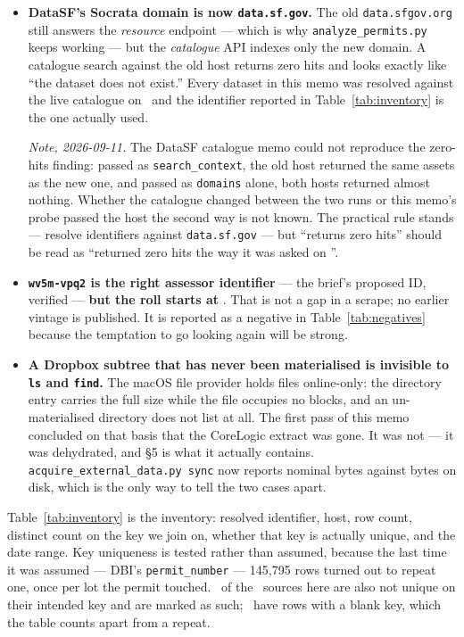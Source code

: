 \documentclass[11pt]{article}
\begin{document}
\begin{itemize}
\item \textbf{DataSF's Socrata domain is now \texttt{data.sf.gov}.} The old
\texttt{data.sfgov.org} still answers the \emph{resource} endpoint --- which is why
\texttt{analyze\_permits.py} keeps working --- but the \emph{catalogue} API indexes only the
new domain. A catalogue search against the old host returns zero hits and looks exactly like
``the dataset does not exist.'' Every dataset in this memo was resolved against the live
catalogue on \acqRetrieved\ and the identifier reported in Table~\ref{tab:inventory} is the
one actually used.

\emph{Note, 2026-09-11.} The DataSF catalogue memo could not reproduce the zero-hits finding:
passed as \texttt{search\_context}, the old host returned the same assets as the new one, and
passed as \texttt{domains} alone, both hosts returned almost nothing. Whether the catalogue
changed between the two runs or this memo's probe passed the host the second way is not known.
The practical rule stands --- resolve identifiers against \texttt{data.sf.gov} --- but ``returns
zero hits'' should be read as ``returned zero hits the way it was asked on \acqRetrieved''.
\item \textbf{\texttt{wv5m-vpq2} is the right assessor identifier} --- the brief's proposed
ID, verified --- \textbf{but the roll starts at \acqAsrFirst}. That is not a gap in a scrape; no
earlier vintage is published. It is reported as a negative in
Table~\ref{tab:negatives} because the temptation to go looking again will be strong.
\item \textbf{A Dropbox subtree that has never been materialised is invisible to
\texttt{ls} and \texttt{find}.} The macOS file provider holds files online-only: the
directory entry carries the full size while the file occupies no blocks, and an
un-materialised directory does not list at all. The first pass of this memo concluded on that
basis that the CoreLogic extract was gone. It was not --- it was dehydrated, and \S5 is what
it actually contains. \texttt{acquire\_external\_data.py sync} now reports nominal bytes
against bytes on disk, which is the only way to tell the two cases apart.
\end{itemize}



Table~\ref{tab:inventory} is the inventory: resolved identifier, host, row count, distinct
count on the key we join on, whether that key is actually unique, and the date range. Key
uniqueness is tested rather than assumed, because the last time it was assumed --- DBI's
\texttt{permit\_number} --- 145{,}795 rows turned out to repeat one, once per lot the permit
touched. \acqNonUniqueSources\ of the \acqSourcesCached\ sources here are also not unique on
their intended key and are marked as such; \acqNullKeySources\ have rows with a blank key,
which the table counts apart from a repeat.
\end{document}
